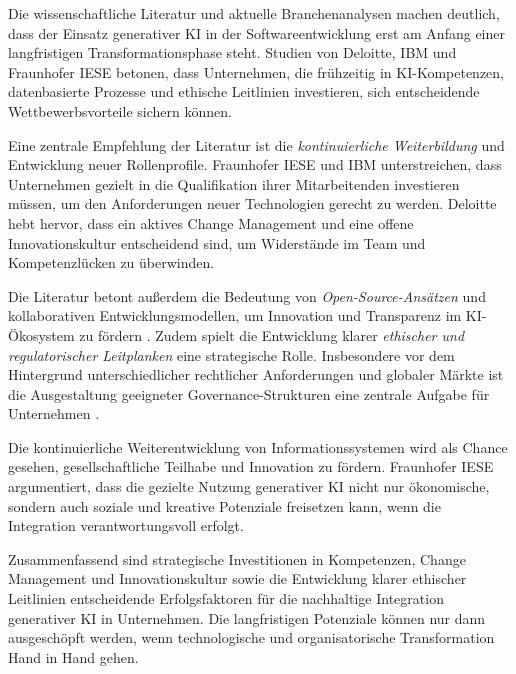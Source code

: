 
Die wissenschaftliche Literatur und aktuelle Branchenanalysen machen deutlich,
dass der Einsatz generativer KI in der Softwareentwicklung erst am Anfang einer
langfristigen Transformationsphase steht. Studien von Deloitte, IBM und
Fraunhofer IESE \cite{siebert_generative_2024, a_ki_2024, s_future_2024}
betonen, dass Unternehmen, die frühzeitig in KI-Kompetenzen, datenbasierte
Prozesse und ethische Leitlinien investieren, sich entscheidende
Wettbewerbsvorteile sichern können.

Eine zentrale Empfehlung der Literatur ist die \textit{kontinuierliche
    Weiterbildung} und Entwicklung neuer Rollenprofile. Fraunhofer IESE und IBM
\cite{siebert_generative_2024, a_ki_2024} unterstreichen, dass Unternehmen
gezielt in die Qualifikation ihrer Mitarbeitenden investieren müssen, um den
Anforderungen neuer Technologien gerecht zu werden. Deloitte
\cite{s_future_2024} hebt hervor, dass ein aktives Change Management und eine
offene Innovationskultur entscheidend sind, um Widerstände im Team und
Kompetenzlücken zu überwinden.

Die Literatur betont außerdem die Bedeutung von \textit{Open-Source-Ansätzen}
und kollaborativen Entwicklungsmodellen, um Innovation und Transparenz im
KI-Ökosystem zu fördern \cite{siebert_generative_2024, a_ki_2024}. Zudem spielt
die Entwicklung klarer \textit{ethischer und regulatorischer Leitplanken} eine
strategische Rolle. Insbesondere vor dem Hintergrund unterschiedlicher
rechtlicher Anforderungen und globaler Märkte ist die Ausgestaltung geeigneter
Governance-Strukturen eine zentrale Aufgabe für Unternehmen
\cite{siebert_generative_2024, s_future_2024}.

Die kontinuierliche Weiterentwicklung von Informationssystemen wird als Chance
gesehen, gesellschaftliche Teilhabe und Innovation zu fördern. Fraunhofer IESE
\cite{siebert_generative_2024} argumentiert, dass die gezielte Nutzung
generativer KI nicht nur ökonomische, sondern auch soziale und kreative
Potenziale freisetzen kann, wenn die Integration verantwortungsvoll erfolgt.

Zusammenfassend sind strategische Investitionen in Kompetenzen, Change
Management und Innovationskultur sowie die Entwicklung klarer ethischer
Leitlinien entscheidende Erfolgsfaktoren für die nachhaltige Integration
generativer KI in Unternehmen. Die langfristigen Potenziale können nur dann
ausgeschöpft werden, wenn technologische und organisatorische Transformation
Hand in Hand gehen.

